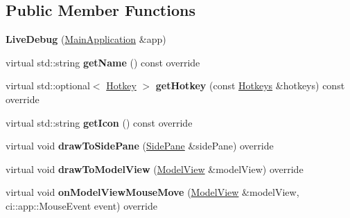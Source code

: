 \subsection*{Public Member Functions}
\begin{DoxyCompactItemize}
\item 
\mbox{\label{classpepr3d_1_1_live_debug_af68bd72aabefe4593946204855ed0f1d}} 
{\bfseries Live\+Debug} (\mbox{\hyperlink{classpepr3d_1_1_main_application}{Main\+Application}} \&app)
\item 
\mbox{\label{classpepr3d_1_1_live_debug_a420f10c060c4c5eb9bcef32353938809}} 
virtual std\+::string {\bfseries get\+Name} () const override
\item 
\mbox{\label{classpepr3d_1_1_live_debug_acf1c75d3b573f28aef50e9073fa482da}} 
virtual std\+::optional$<$ \mbox{\hyperlink{structpepr3d_1_1_hotkey}{Hotkey}} $>$ {\bfseries get\+Hotkey} (const \mbox{\hyperlink{classpepr3d_1_1_hotkeys}{Hotkeys}} \&hotkeys) const override
\item 
\mbox{\label{classpepr3d_1_1_live_debug_ab2ea7bc2137e9b18f3f138d47b793ebb}} 
virtual std\+::string {\bfseries get\+Icon} () const override
\item 
\mbox{\label{classpepr3d_1_1_live_debug_a310f31d348b9437ff1c04e9ca830054d}} 
virtual void {\bfseries draw\+To\+Side\+Pane} (\mbox{\hyperlink{classpepr3d_1_1_side_pane}{Side\+Pane}} \&side\+Pane) override
\item 
\mbox{\label{classpepr3d_1_1_live_debug_a52a05193e6b6a9d4f112af81be3d6683}} 
virtual void {\bfseries draw\+To\+Model\+View} (\mbox{\hyperlink{classpepr3d_1_1_model_view}{Model\+View}} \&model\+View) override
\item 
\mbox{\label{classpepr3d_1_1_live_debug_aaef30c7f133d6d4c9400add728cacbe5}} 
virtual void {\bfseries on\+Model\+View\+Mouse\+Move} (\mbox{\hyperlink{classpepr3d_1_1_model_view}{Model\+View}} \&model\+View, ci\+::app\+::\+Mouse\+Event event) override
\end{DoxyCompactItemize}
